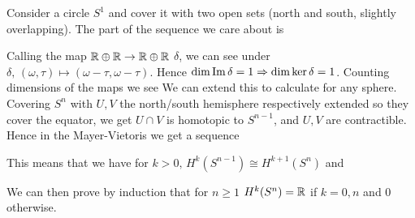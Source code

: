 \documentclass{article}
\begin{document}
\begin{example}
	Consider a circle $S^1$ and cover it with two open sets (north and south, slightly overlapping). The part of the sequence we care about is 
	\begin{center}
	\end{center}
	Calling the map $\mathbb{R} \oplus \mathbb{R} \to \mathbb{R} \oplus \mathbb{R}$ $\delta$, we can see under $\delta, \, (\omega,\tau) \mapsto (\omega-\tau,\omega-\tau)$. Hence $\dim \operatorname{Im} \delta = 1 \Rightarrow \dim \ker \delta = 1$. Counting dimensions of the maps we see 
	We can extend this to calculate for any sphere. Covering $S^n$ with $U,V$ the north/south hemisphere respectively extended so they cover the equator, we get $U\cap V$ is homotopic to $S^{n-1}$, and $U,V$ are contractible. Hence in the Mayer-Vietoris we get a sequence
	\begin{center}
	\end{center}
	This means that we have for $k>0, \, H^k(S^{n-1})\cong H^{k+1}(S^{n})$ and
	\begin{center}
	\end{center}
	We can then prove by induction that for $n \geq 1$ $H^k(S^n) = \mathbb{R}$ if $k=0,n$ and 0 otherwise. 
\end{example}
\end{document}
